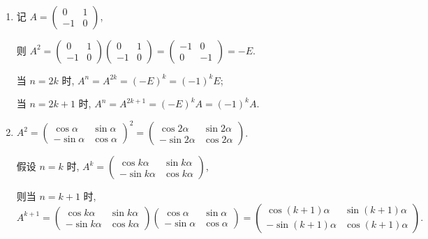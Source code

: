 	 \paragraph{} %
		 \begin{enumerate}
			 \item %
			       记 $A = \begin{pmatrix}
					       0  & 1 \\
					       -1 & 0
				       \end{pmatrix}$,

			       则
			       $A^2 = \begin{pmatrix}
					       0  & 1 \\
					       -1 & 0
				       \end{pmatrix}
				       \begin{pmatrix}
					       0  & 1 \\
					       -1 & 0
				       \end{pmatrix} = \begin{pmatrix}
					       -1 & 0  \\
					       0  & -1
				       \end{pmatrix} = -E$.

			       当 $n = 2k$ 时, $A^n = A^{2k} = (-E)^k = (-1)^k E$;

			       当 $n = 2k+1$ 时, $A^n = A^{2k+1} = (-E)^k A = (-1)^k A$.

			 \item %
			       $A^2 = \begin{pmatrix}
					       \cos\alpha  & \sin\alpha \\
					       -\sin\alpha & \cos\alpha
				       \end{pmatrix}^2 = \begin{pmatrix}
					       \cos2\alpha  & \sin2\alpha \\
					       -\sin2\alpha & \cos2\alpha
				       \end{pmatrix}$.

			       假设 $n = k$ 时, $A^k = \begin{pmatrix}
					       \cos k\alpha  & \sin k\alpha \\
					       -\sin k\alpha & \cos k\alpha
				       \end{pmatrix}$,

			       则当 $n = k+1$ 时,
			       \[
				       A^{k+1} = \begin{pmatrix}
					       \cos k\alpha  & \sin k\alpha \\
					       -\sin k\alpha & \cos k\alpha
				       \end{pmatrix}
				       \begin{pmatrix}
					       \cos\alpha  & \sin\alpha \\
					       -\sin\alpha & \cos\alpha
				       \end{pmatrix} = \begin{pmatrix}
					       \cos(k+1)\alpha  & \sin(k+1)\alpha \\
					       -\sin(k+1)\alpha & \cos(k+1)\alpha
				       \end{pmatrix}.
			       \]


\end{enumerate}
